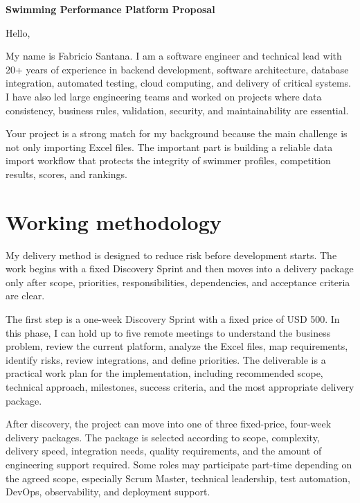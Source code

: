 \documentclass[11pt,a4paper]{article}
\begin{document}
\begin{center}
{\LARGE\bfseries Swimming Performance Platform Proposal}
\end{center}
\vspace{0.5em}

Hello,\par

My name is Fabricio Santana. I am a software engineer and technical lead with 20+ years of experience in backend development, software architecture, database integration, automated testing, cloud computing, and delivery of critical systems. I have also led large engineering teams and worked on projects where data consistency, business rules, validation, security, and maintainability are essential.\par

Your project is a strong match for my background because the main challenge is not only importing Excel files. The important part is building a reliable data import workflow that protects the integrity of swimmer profiles, competition results, scores, and rankings.\par


\section*{Working methodology}

My delivery method is designed to reduce risk before development starts. The work begins with a fixed Discovery Sprint and then moves into a delivery package only after scope, priorities, responsibilities, dependencies, and acceptance criteria are clear.\par

The first step is a one-week Discovery Sprint with a fixed price of USD 500. In this phase, I can hold up to five remote meetings to understand the business problem, review the current platform, analyze the Excel files, map requirements, identify risks, review integrations, and define priorities. The deliverable is a practical work plan for the implementation, including recommended scope, technical approach, milestones, success criteria, and the most appropriate delivery package.\par

After discovery, the project can move into one of three fixed-price, four-week delivery packages. The package is selected according to scope, complexity, delivery speed, integration needs, quality requirements, and the amount of engineering support required. Some roles may participate part-time depending on the agreed scope, especially Scrum Master, technical leadership, test automation, DevOps, observability, and deployment support.\par
\end{document}
